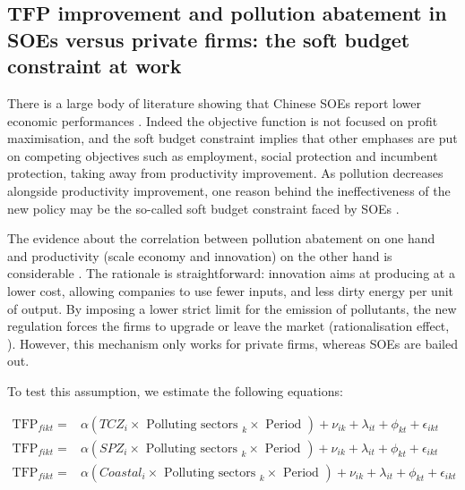 \documentclass[12pt]{article}
\begin{document}
\subsection{TFP improvement and pollution abatement in SOEs versus private firms: the soft budget constraint at work} \label{sec:tfp}

There is a large body of literature showing that Chinese SOEs report lower economic performances \citep{Zhang2004-ij, Dougherty2007-qu,Qian1996-ab}. Indeed the objective function is not focused on profit maximisation, and the soft budget constraint implies that other emphases are put on competing objectives such as employment, social protection and incumbent protection, taking away from productivity improvement. As pollution decreases alongside productivity improvement, one reason behind the ineffectiveness of the new policy may be the so-called soft budget constraint faced by SOEs \citep{Cole2008-pj}.

The evidence about the correlation between pollution abatement on one hand and productivity (scale economy and innovation) on the other hand is considerable \citep{Andersen2016-pa, Andersen2017-wf, Cole2008-pj}. The rationale is straightforward: innovation aims at producing at a lower cost, allowing companies to use fewer inputs, and less dirty energy per unit of output. By imposing a lower strict limit for the emission of pollutants, the new regulation forces the firms to upgrade or leave the market (rationalisation effect, \cite{Cole2008-pj}). However, this mechanism only works for private firms, whereas SOEs are bailed out. 

To test this assumption, we estimate the following equations:

\begin{align} \label{eq:tcz1}
\text {TFP}_{fikt}=& \alpha (T C Z_{i} \times \text {  Polluting sectors }_{k} \times \text { Period }) +\nu_{ik}+\lambda_{it} +\phi_{kt} +\epsilon_{ikt}  \\
\text {TFP}_{fikt}=& \alpha (SPZ_{i} \times \text {  Polluting sectors }_{k} \times \text { Period }) +\nu_{ik}+\lambda_{it} +\phi_{kt} +\epsilon_{ikt}  \\
\text {TFP}_{fikt}=& \alpha (Coastal_{i} \times \text {  Polluting sectors }_{k} \times \text { Period }) +\nu_{ik}+\lambda_{it} +\phi_{kt} +\epsilon_{ikt}  
\end{align}
\end{document}
